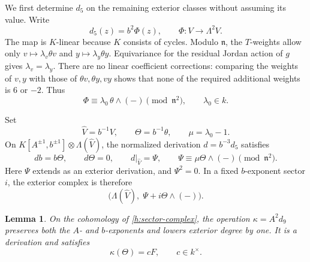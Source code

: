 \documentclass[11pt]{article}
\newtheorem{lemma}[theorem]{Lemma}
\theoremstyle{definition}
\theoremstyle{remark}
\numberwithin{equation}{section}
\begin{document}
We first determine $d_5$ on the remaining exterior classes without
assuming its value. Write
\[
 d_5(z)=b^2\Phi(z),\qquad
 \Phi:V\longrightarrow\Lambda^2V.
\]
The map is $K$-linear because $K$ consists of cycles. Modulo
$\mathfrak n$, the $T$-weights allow only
$v\mapsto\lambda_v\theta v$ and
$y\mapsto\lambda_y\theta y$. Equivariance for the residual Jordan
action of $g$ gives $\lambda_v=\lambda_y$. There are no linear
coefficient corrections: comparing the weights of $v,y$ with those of
$\theta v,\theta y,vy$ shows that none of the required additional
weights is $6$ or $-2$. Thus
\begin{equation}
 \label{h:phi-initial}
 \Phi\equiv\lambda_0\,\theta\wedge(-)\pmod{\mathfrak n^2},
 \qquad \lambda_0\in k.
\end{equation}

Set
\[
 \widehat V=b^{-1}V,\qquad \Theta=b^{-1}\theta,
 \qquad \mu=\lambda_0-1.
\]
On $K[A^{\pm1},b^{\pm1}]\otimes\Lambda(\widehat V)$, the normalized
derivation $d=b^{-3}d_5$ satisfies
\begin{equation}
 \label{h:normalized-d5}
 db=b\Theta,\qquad d\Theta=0,\qquad
 d|_{\widehat V}=\Psi,\qquad
 \Psi\equiv\mu\Theta\wedge(-)\pmod{\mathfrak n^2}.
\end{equation}
Here $\Psi$ extends as an exterior derivation, and $\Psi^2=0$.
In a fixed $b$-exponent sector $i$, the exterior complex is therefore
\begin{equation}
 \label{h:sector-complex}
 \bigl(\Lambda(\widehat V),\;\Psi+i\Theta\wedge(-)\bigr).
\end{equation}

\begin{lemma}
 \label{h:normalized-d9}
 On the cohomology of \eqref{h:sector-complex}, the operation
 $\kappa=A^2d_9$ preserves both the $A$- and $b$-exponents and lowers
 exterior degree by one. It is a derivation and satisfies
 \begin{equation}
 \label{h:kappa-theta}
  \kappa(\Theta)=cF,\qquad c\in k^{\times}.
 \end{equation}
\end{lemma}
\end{document}
